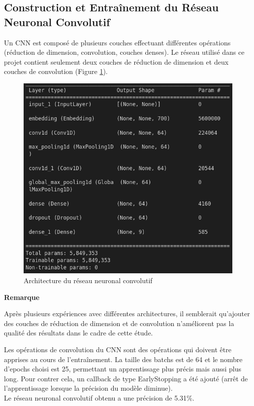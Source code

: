 \subsection{Construction et Entraînement du Réseau Neuronal Convolutif}
Un CNN est composé de plusieurs couches effectuant différentes opérations (réduction de dimension, convolution, couches denses). Le réseau utilisé dans ce projet contient seulement deux couches de réduction de dimension et deux couches de convolution (Figure \ref{architecture_cnn}).

\begin{figure}
    \center
    \includegraphics[scale=.3]{img/architecture_cnn.png}
    \caption{Architecture du réseau neuronal convolutif}
    \label{architecture_cnn}
\end{figure}

\noindent
\begin{minipage}[!hc]{0.12\textwidth}
   \textbf{Remarque}
\end{minipage}
\vrule\enskip\vrule\quad\begin{minipage}{\dimexpr 0.87\textwidth-0.8pt-1.5em}
Après plusieurs expériences avec différentes architectures, il semblerait qu'ajouter des couches de réduction de dimension et de convolution n'améliorent pas la qualité des résultats dans le cadre de cette étude.
\end{minipage}

Les opérations de convolution du CNN sont des opérations qui doivent être apprises au cours de l'entraînement. \cite{convolution} La taille des batchs est de 64 et le nombre d'epochs choisi est 25, permettant un apprentissage plus précis mais aussi plus long. Pour contrer cela, un callback de type \textsf{EarlyStopping} a été ajouté (arrêt de l'apprentissage lorsque la précision du modèle diminue).\\
Le réseau neuronal convolutif obtenu a une précision de 5.31\%.

